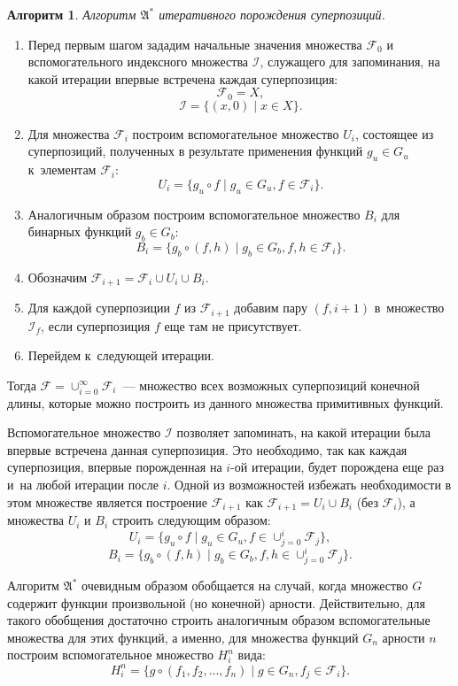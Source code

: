 \documentclass[12pt,a4paper]{article}
\newtheorem{algo}{Алгоритм}
\begin{document}
\begin{algo}
  Алгоритм $\mathfrak{A^*}$ итеративного порождения суперпозиций.
\end{algo}
\begin{enumerate}
  \item Перед первым шагом зададим начальные значения множества
	$\mathcal{F}_0$ и вспомогательного индексного множества $\mathcal{I}$,
	служащего для запоминания, на какой итерации впервые встречена
	каждая суперпозиция:
	\[
	  \mathcal{F}_0 = X,
	\]
	\[
	  \mathcal{I} = \{ (x, 0) \mid x \in X \}.
	\]
  \item Для множества $\mathcal{F}_i$ построим вспомогательное множество $U_i$,
	состоящее из суперпозиций, полученных в результате применения функций
	$g_u \in G_u$ к~элементам $\mathcal{F}_i$:
	\[
	  U_i = \{ g_u \circ f \mid g_u \in G_u, f \in \mathcal{F}_i \}.
	\]
  \item Аналогичным образом построим вспомогательное множество $B_i$ для
	бинарных функций $g_b \in G_b$:
	\[
	  B_i = \{ g_b \circ (f, h) \mid g_b \in G_b, f, h \in \mathcal{F}_i \}.
	\]
  \item Обозначим $\mathcal{F}_{i+1} = \mathcal{F}_i \cup U_i \cup B_i$.
  \item Для каждой суперпозиции $f$ из $\mathcal{F}_{i+1}$ добавим пару
	$(f, i+1)$ в~множество $\mathcal{I}_f$, если суперпозиция $f$ еще там
	не присутствует.
  \item Перейдем к~следующей итерации. 
\end{enumerate}

Тогда $\mathcal{F} = \cup_{i=0}^\infty \mathcal{F}_i$~--- множество всех
возможных суперпозиций конечной длины, которые можно построить из
данного множества примитивных функций.

Вспомогательное множество $\mathcal{I}$ позволяет запоминать, на какой
итерации была впервые встречена данная суперпозиция. Это необходимо, так
как каждая суперпозиция, впервые порожденная на $i$-ой итерации, будет
порождена еще раз и~на любой итерации после $i$. Одной из возможностей
избежать необходимости в этом множестве является построение
$\mathcal{F}_{i+1}$ как $\mathcal{F}_{i+1} = U_i \cup B_i$ (без
$\mathcal{F}_i$), а множества $U_i$ и $B_i$ строить следующим образом:
\[
  U_i = \{ g_u \circ f \mid g_u \in G_u, f \in \cup_{j=0}^{i} \mathcal{F}_j \},
\]
\[
  B_i = \{ g_b \circ (f, h) \mid g_b \in G_b, f, h \in \cup_{j=0}^{i} \mathcal{F}_j \}.
\]

Алгоритм $\mathfrak{A^*}$ очевидным образом обобщается на случай, когда
множество $G$ содержит функции произвольной (но конечной) арности.
Действительно, для такого обобщения достаточно строить аналогичным образом
вспомогательные множества для этих функций, а именно, для множества функций
$G_n$ арности $n$ построим вспомогательное множество $H_i^n$ вида:
\[
H_i^n = \{ g \circ (f_1, f_2, \dots, f_n) \mid g \in G_n, f_j \in \mathcal{F}_i \}.
\]
\end{document}

